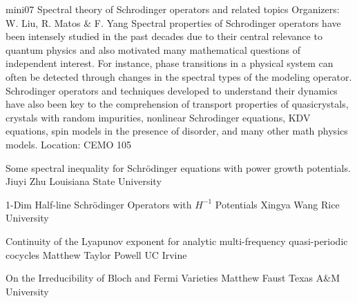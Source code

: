 \mini
{mini07}
{Spectral theory of Schrodinger operators and related topics}
{Organizers: W. Liu, R. Matos \& F. Yang}
{Spectral properties of Schrodinger operators have been intensely studied in the past decades due to their central relevance to quantum physics and also motivated many mathematical questions of independent interest. For instance, phase transitions in a physical system can often be detected through changes in the spectral types of the modeling operator. Schrodinger operators and techniques developed to understand their dynamics have also been key to the comprehension of transport properties of quasicrystals, crystals with random impurities, nonlinear Schrodinger equations, KDV equations, spin models in the presence of disorder, and many other math physics models.}
{Location: CEMO 105}

\begin{talks}
\item\talk
{Some spectral inequality for Schrödinger equations with power growth potentials.}
{Jiuyi Zhu}
{Louisiana State University}
\item\talk
{1-Dim Half-line Schrödinger Operators with $H^{-1}$ Potentials}
{Xingya Wang}
{Rice University}
\item\talk
{Continuity of the Lyapunov exponent for analytic multi-frequency quasi-periodic cocycles}
{Matthew Taylor Powell}
{UC Irvine}
\item\talk
{On the Irreducibility of Bloch and Fermi Varieties}
{Matthew Faust}
{Texas A\&M University}
\end{talks}
\room
